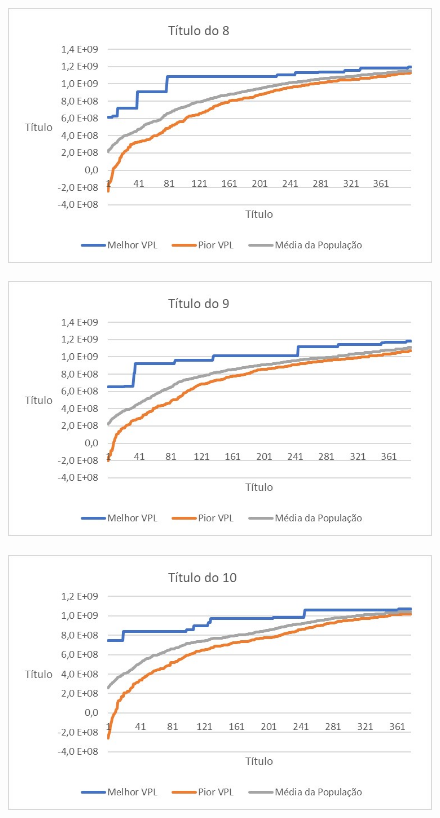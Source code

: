 \documentclass[12pt,a4paper]{report}
\begin{document}
\begin{figure}[H]
\centering

\includegraphics[scale=1]{AGRPCO2/8}

\end{figure}

\begin{figure}[H]
\centering

\includegraphics[scale=1]{AGRPCO2/9}

\end{figure}

\begin{figure}[H]
\centering

\includegraphics[scale=1]{AGRPCO2/10}

\end{figure}
\end{document}
